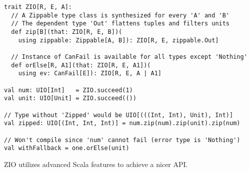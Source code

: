 \begin{algorithm}

\begin{verbatim}
trait ZIO[R, E, A]:
  // A Zippable type class is synthesized for every 'A' and 'B'
  // The dependent type 'Out' flattens tuples and filters units
  def zip[B](that: ZIO[R, E, B])(
    using zippable: Zippable[A, B]): ZIO[R, E, zippable.Out]
  
  // Instance of CanFail is available for all types except 'Nothing'
  def orElse[R, A1](that: ZIO[R, E, A1])(
    using ev: CanFail[E]): ZIO[R, E, A | A1]

val num: UIO[Int]   = ZIO.succeed(1)
val unit: UIO[Unit] = ZIO.succeed(())

// Type without 'Zipped' would be UIO[(((Int, Int), Unit), Int)]
val zipped: UIO[(Int, Int, Int)] = num.zip(num).zip(unit).zip(num)

// Won't compile since 'num' cannot fail (error type is 'Nothing')
val withFallback = one.orElse(unit)
\end{verbatim}

\caption{ZIO utilizes advanced Scala features to achieve a nicer API. \label{zio:nice-api}}
\end{algorithm}